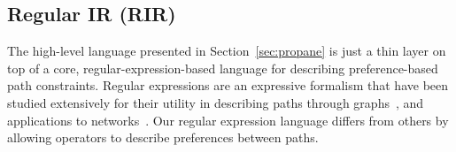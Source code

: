 \subsection{Regular IR (RIR)} 
\label{sec:rir}

The high-level language presented in Section~\ref{sec:propane} is just a thin layer on top of a core, regular-expression-based language for describing preference-based path constraints. Regular expressions are an expressive formalism that have been studied extensively for their utility in describing paths through graphs~\cite{bib:todo}, and applications to networks~\cite{bib:todo}. Our regular expression language differs from others by allowing operators to describe preferences between paths.

\newcommand{\BNFALT}{\;\;|\;\;}
\newcommand{\hdr}[2]{\flushleft \chdr{#1}{#2}}
\newcommand{\chdr}[2]{\textbf{#1} {#2} \\ \centering}

